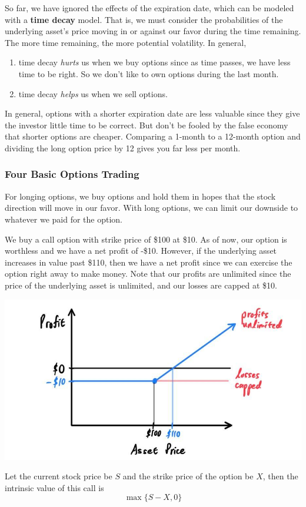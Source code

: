 \documentclass{article}
\begin{document}
\begin{definition}
So far, we have ignored the effects of the expiration date, which can be modeled with a \textbf{time decay} model. That is, we must consider the probabilities of the underlying asset's price moving in or against our favor during the time remaining. The more time remaining, the more potential volatility. In general, 
\begin{enumerate}
    \item time decay \textit{hurts} us when we buy options since as time passes, we have less time to be right. So we don't like to own options during the last month. 
    \item time decay \textit{helps} us when we sell options. 
\end{enumerate}
\end{definition}

In general, options with a shorter expiration date are less valuable since they give the investor little time to be correct. But don't be fooled by the false economy that shorter options are cheaper. Comparing a 1-month to a 12-month option and dividing the long option price by 12 gives you far less per month. 

\subsubsection{Four Basic Options Trading}

For longing options, we buy options and hold them in hopes that the stock direction will move in our favor. With long options, we can limit our downside to whatever we paid for the option. 

\begin{definition}
We buy a call option with strike price of \$100 at \$10. As of now, our option is worthless and we have a net profit of -\$10. However, if the underlying asset increases in value past \$110, then we have a net profit since we can exercise the option right away to make money. Note that our profits are unlimited since the price of the underlying asset is unlimited, and our losses are capped at \$10. 
\begin{center}
    \includegraphics[scale=0.3]{img/long_call.jpg}
\end{center}
Let the current stock price be $S$ and the strike price of the option be $X$, then the intrinsic value of this call is 
\[\max\{S - X, 0\}\]
\end{definition}
\end{document}
